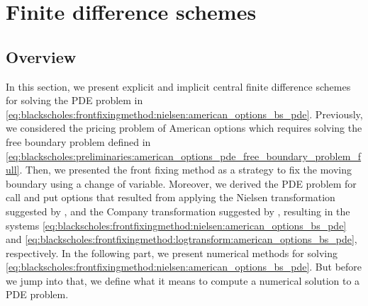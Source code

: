 \section{Finite difference schemes} \label{sec:finitedifferencesschemes}
\subsection{Overview}

In this section, we present explicit and implicit central finite difference schemes for solving the PDE problem in \eqref{eq:blackscholes:frontfixingmethod:nielsen:american_options_bs_pde}. Previously, we considered the pricing problem of American options which requires solving the free boundary problem defined in \eqref{eq:blackscholes:preliminaries:american_options_pde_free_boundary_problem_full}.
Then, we presented the front fixing method as a strategy to fix the moving boundary using a change of variable. Moreover, we derived the PDE problem for call and put options that resulted from applying the Nielsen transformation suggested by \cite{nielsen_2001}, and the Company transformation suggested by \cite{company_egorova_jodar_2014}, resulting in the systems \eqref{eq:blackscholes:frontfixingmethod:nielsen:american_options_bs_pde} and \eqref{eq:blackscholes:frontfixingmethod:logtransform:american_options_bs_pde}, respectively. In the following part, we present numerical methods for solving \eqref{eq:blackscholes:frontfixingmethod:nielsen:american_options_bs_pde}. But before we jump into that, we define what it means to compute a numerical solution to a PDE problem.

